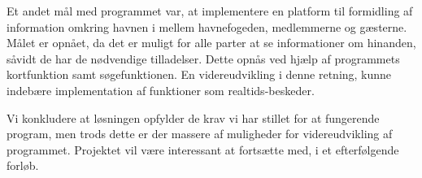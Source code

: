 Et andet mål med programmet var, at implementere en platform til formidling af information omkring havnen i mellem havnefogeden, medlemmerne og gæsterne. Målet er opnået, da det er muligt for alle parter at se informationer om hinanden, såvidt de har de nødvendige tilladelser. Dette opnås ved hjælp af programmets kortfunktion samt søgefunktionen. En videreudvikling i denne retning, kunne indebære implementation af funktioner som realtids-beskeder.

Vi konkludere at løsningen opfylder de krav vi har stillet for at fungerende program, men trods dette er der massere af muligheder for videreudvikling af programmet. Projektet vil være interessant at fortsætte med, i et efterfølgende forløb. 

